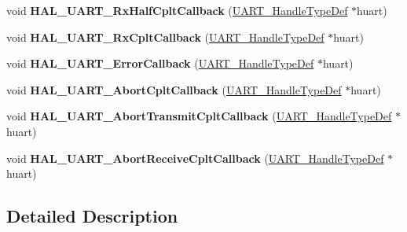 \begin{DoxyCompactItemize}
void {\bfseries H\+A\+L\+\_\+\+U\+A\+R\+T\+\_\+\+Rx\+Half\+Cplt\+Callback} (\mbox{\hyperlink{group___u_a_r_t___exported___types_ga7adf4f3e4c3ecde572be5925c915a967}{U\+A\+R\+T\+\_\+\+Handle\+Type\+Def}} $\ast$huart)
\item 
\mbox{\label{group___u_a_r_t___exported___functions___group2_gae494a9643f29b87d6d81e5264e60e57b}} 
void {\bfseries H\+A\+L\+\_\+\+U\+A\+R\+T\+\_\+\+Rx\+Cplt\+Callback} (\mbox{\hyperlink{group___u_a_r_t___exported___types_ga7adf4f3e4c3ecde572be5925c915a967}{U\+A\+R\+T\+\_\+\+Handle\+Type\+Def}} $\ast$huart)
\item 
\mbox{\label{group___u_a_r_t___exported___functions___group2_ga0e0456ea96d55db31de947fb3e954f18}} 
void {\bfseries H\+A\+L\+\_\+\+U\+A\+R\+T\+\_\+\+Error\+Callback} (\mbox{\hyperlink{group___u_a_r_t___exported___types_ga7adf4f3e4c3ecde572be5925c915a967}{U\+A\+R\+T\+\_\+\+Handle\+Type\+Def}} $\ast$huart)
\item 
\mbox{\label{group___u_a_r_t___exported___functions___group2_gacdcb274a742093c45869f2cfbb0a8b09}} 
void {\bfseries H\+A\+L\+\_\+\+U\+A\+R\+T\+\_\+\+Abort\+Cplt\+Callback} (\mbox{\hyperlink{group___u_a_r_t___exported___types_ga7adf4f3e4c3ecde572be5925c915a967}{U\+A\+R\+T\+\_\+\+Handle\+Type\+Def}} $\ast$huart)
\item 
\mbox{\label{group___u_a_r_t___exported___functions___group2_gacf94995fb9986930151f3c5586d37e5c}} 
void {\bfseries H\+A\+L\+\_\+\+U\+A\+R\+T\+\_\+\+Abort\+Transmit\+Cplt\+Callback} (\mbox{\hyperlink{group___u_a_r_t___exported___types_ga7adf4f3e4c3ecde572be5925c915a967}{U\+A\+R\+T\+\_\+\+Handle\+Type\+Def}} $\ast$huart)
\item 
\mbox{\label{group___u_a_r_t___exported___functions___group2_ga0f9d15c5ae7b69f09e0ee5f2461e7e7a}} 
void {\bfseries H\+A\+L\+\_\+\+U\+A\+R\+T\+\_\+\+Abort\+Receive\+Cplt\+Callback} (\mbox{\hyperlink{group___u_a_r_t___exported___types_ga7adf4f3e4c3ecde572be5925c915a967}{U\+A\+R\+T\+\_\+\+Handle\+Type\+Def}} $\ast$huart)
\end{DoxyCompactItemize}


\subsection{Detailed Description}
